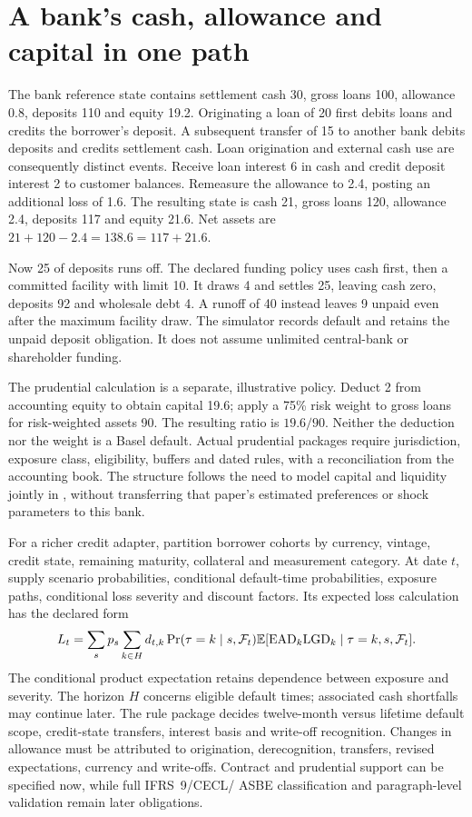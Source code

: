 \section{A bank's cash, allowance and capital in one path}

The bank reference state contains settlement cash 30, gross loans 100,
allowance 0.8, deposits 110 and equity 19.2. Originating a loan of 20 first
debits loans and credits the borrower's deposit. A subsequent transfer of 15
to another bank debits deposits and credits settlement cash. Loan origination
and external cash use are consequently distinct events. Receive loan interest
6 in cash and credit deposit interest 2 to customer balances. Remeasure the
allowance to 2.4, posting an additional loss of 1.6. The resulting state is
cash 21, gross loans 120, allowance 2.4, deposits 117 and equity 21.6.
Net assets are $21+120-2.4=138.6=117+21.6$.

Now 25 of deposits runs off. The declared funding policy uses cash first,
then a committed facility with limit 10. It draws 4 and settles 25, leaving
cash zero, deposits 92 and wholesale debt 4. A runoff of 40 instead leaves
9 unpaid even after the maximum facility draw. The simulator records default
and retains the unpaid deposit obligation. It does not assume unlimited
central-bank or shareholder funding.

The prudential calculation is a separate, illustrative policy. Deduct 2 from
accounting equity to obtain capital 19.6; apply a 75\% risk weight to gross
loans for risk-weighted assets 90. The resulting ratio is $19.6/90$.
Neither the deduction nor the weight is a Basel default. Actual prudential
packages require jurisdiction, exposure class, eligibility, buffers and dated
rules, with a reconciliation from the accounting book. The structure follows
the need to model capital and liquidity jointly in
\citet[Section 2]{behn2019}, without transferring that paper's estimated
preferences or shock parameters to this bank.

For a richer credit adapter, partition borrower cohorts by currency, vintage,
credit state, remaining maturity, collateral and measurement category. At date
$t$, supply scenario probabilities, conditional default-time probabilities,
exposure paths, conditional loss severity and discount factors. Its expected
loss calculation has the declared form
\[
 L_t=\sum_s p_s\sum_{k\in H}
  d_{t,k}\Pr(\tau=k\mid s,\mathcal F_t)
  \mathbb{E}[\mathrm{EAD}_k\mathrm{LGD}_k\mid\tau=k,s,\mathcal F_t].
\]
The conditional product expectation retains dependence between exposure and
severity. The horizon $H$ concerns eligible default times; associated cash
shortfalls may continue later. The rule package decides twelve-month versus
lifetime default scope, credit-state transfers, interest basis and write-off
recognition. Changes in allowance must be attributed to origination,
derecognition, transfers, revised expectations, currency and write-offs.
Contract and prudential support can be specified now, while full IFRS~9/CECL/
ASBE classification and paragraph-level validation remain later obligations.

